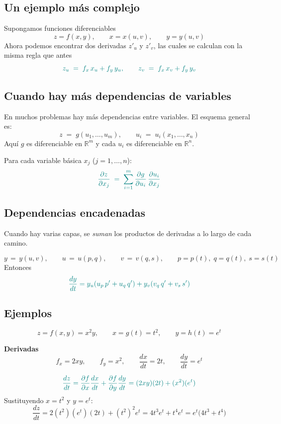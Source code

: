 \documentclass{article}
\begin{document}
\subsection*{Un ejemplo más complejo}




Supongamos funciones diferenciables
\[
z = f(x,y), \qquad x = x(u,v), \qquad y = y(u,v)
\]
Ahora podemos encontrar dos derivadas $z'_u$ y $z'_v$, las cuales se calculan con la misma regla que antes
\[\color{teal}{\,z_u \;=\; f_x\,x_u + f_y\,y_u, \qquad
z_v \;=\; f_x\,x_v + f_y\,y_v\, }
\]


\subsection*{Cuando hay más dependencias de variables}

En muchos problemas hay más dependencias entre variables. El esquema general es:
\[
z \;=\; g(u_1,\dots,u_m),
\qquad
u_i \;=\; u_i(x_1,\dots,x_n)
\]
Aquí \(g\) es diferenciable en \(\mathbb{R}^m\) y cada \(u_i\) es diferenciable en \(\mathbb{R}^n\).

Para cada variable básica \(x_j\) (\(j=1,\dots,n\)):
\[
\color{teal}
\frac{\partial z}{\partial x_j}
\;=\;\sum_{i=1}^m \frac{\partial g}{\partial u_i}\,\frac{\partial u_i}{\partial x_j}
\]


\subsection*{Dependencias encadenadas}
Cuando hay varias capas, se \emph{suman} los productos de derivadas a lo largo de cada camino.

\medskip
\[
y\,=\,y(u,v),\qquad
u\,=\,u(p,q),\qquad
v\,=\,v(q,s),\qquad
p=p(t),\; q=q(t),\; s=s(t)
\]
Entonces
\[
\color{teal}
\frac{dy}{dt}
= y_u\!\left(u_p\,p' + u_q\,q'\right)
+ y_v\!\left(v_q\,q' + v_s\,s'\right)
\]






\subsection*{Ejemplos}

\[
z=f(x,y)=x^{2}y, 
\qquad x=g(t)=t^{2}, 
\qquad y=h(t)=e^{t}
\]

\textbf{Derivadas}
\[
f_x=2xy, \qquad f_y=x^{2},
\qquad \frac{dx}{dt}=2t, \qquad \frac{dy}{dt}=e^{t}
\]

\[ \color{teal}
\frac{dz}{dt}
=\frac{\partial f}{\partial x}\frac{dx}{dt}
+\frac{\partial f}{\partial y}\frac{dy}{dt}
= (2xy)(2t) + (x^{2})(e^{t})
\]
Sustituyendo \(x=t^{2}\) y \(y=e^{t}\):
\[
\frac{dz}{dt}
= 2(t^{2})(e^{t})(2t) + (t^{2})^{2}e^{t}
= 4t^{3}e^{t} + t^{4}e^{t}
= e^{t}\big(4t^{3}+t^{4}\big)
\]
\end{document}
